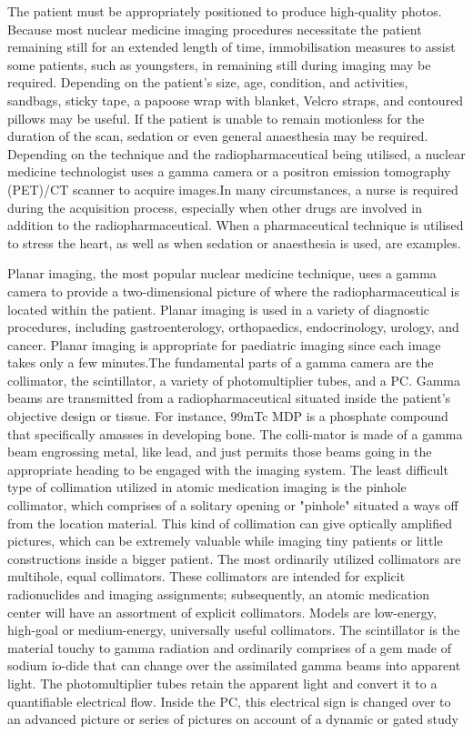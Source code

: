 \documentclass[12pt]{article}
\begin{document}
\par
The patient must be appropriately positioned to produce high-quality photos. Because most nuclear medicine imaging procedures necessitate the patient remaining still for an extended length of time, immobilisation measures to assist some patients, such as youngsters, in remaining still during imaging may be required. Depending on the patient's size, age, condition, and activities, sandbags, sticky tape, a papoose wrap with blanket, Velcro straps, and contoured pillows may be useful. If the patient is unable to remain motionless for the duration of the scan, sedation or even general anaesthesia may be required. Depending on the technique and the radiopharmaceutical being utilised, a nuclear medicine technologist uses a gamma camera or a positron emission tomography (PET)/CT scanner to acquire images.In many circumstances, a nurse is required during the acquisition process, especially when other drugs are involved in addition to the radiopharmaceutical. When a pharmaceutical technique is utilised to stress the heart, as well as when sedation or anaesthesia is used, are examples.
\par
Planar imaging, the most popular nuclear medicine technique, uses a gamma camera to provide a two-dimensional picture of where the radiopharmaceutical is located within the patient. Planar imaging is used in a variety of diagnostic procedures, including gastroenterology, orthopaedics, endocrinology, urology, and cancer. Planar imaging is appropriate for paediatric imaging since each image takes only a few minutes.The fundamental parts of a gamma camera are the collimator, the scintillator, a variety of photomultiplier tubes, and a PC. Gamma beams are transmitted from a radiopharmaceutical situated inside the patient's objective design or tissue. For instance, 99mTc MDP is a phosphate compound that specifically amasses in developing bone. The colli-mator is made of a gamma beam engrossing metal, like lead, and just permits those beams going in the appropriate
heading to be engaged with the imaging system. The least difficult type of collimation utilized in atomic medication imaging is the pinhole collimator, which comprises of a solitary opening or "pinhole" situated a ways off from the location material. This kind of collimation can give optically amplified pictures, which can be extremely valuable while imaging tiny patients or little constructions inside a bigger patient.
The most ordinarily utilized collimators are multihole, equal collimators. These collimators are intended for explicit radionuclides and imaging assignments; subsequently, an atomic medication center will have an assortment of explicit collimators. Models are low-energy, high-goal or medium-energy, universally useful collimators. The scintillator is the material touchy to gamma radiation and ordinarily comprises of a gem made of sodium io-dide that can change over the assimilated gamma beams into apparent light. The photomultiplier tubes retain the apparent light and convert it to a quantifiable electrical flow. Inside the PC, this electrical sign is changed over to an advanced picture or series of pictures on account of a dynamic or gated study
\end{document}
